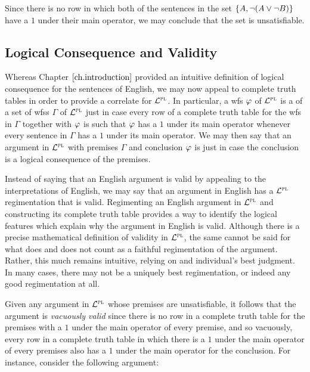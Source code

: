 Since there is no row in which both of the sentences in the set $\lbrace A, \neg (A \vee \neg B)\rbrace$ have a $1$ under their main operator, we may conclude that the set is unsatisfiable.




\subsection{Logical Consequence and Validity}
\label{sub:Consequence}



Whereas Chapter $\ref{ch.introduction}$ provided an intuitive definition of logical consequence for the sentences of English, we may now appeal to complete truth tables in order to provide a correlate for $\mathcal{L}^{\textsc{pl}}$.
In particular, a wfs $\varphi$ of $\mathcal{L}^{\textsc{pl}}$ is a  of a set of wfss $\Gamma$ of $\mathcal{L}^{\textsc{pl}}$ just in case every row of a complete truth table for the wfs in $\Gamma$ together with $\varphi$ is such that $\varphi$ has a $1$ under its main operator whenever every sentence in $\Gamma$ has a $1$ under its main operator. 
We may then say that an argument in $\mathcal{L}^{\textsc{pl}}$ with premises $\Gamma$ and conclusion $\varphi$ is  just in case the conclusion is a logical consequence of the premises. 

Instead of saying that an English argument is valid by appealing to the interpretations of English, we may say that an argument in English has a $\mathcal{L}^{\textsc{pl}}$ regimentation that is valid. 
Regimenting an English argument in $\mathcal{L}^{\textsc{pl}}$ and constructing its complete truth table provides a way to identify the logical features which explain why the argument in English is valid.
Although there is a precise mathematical definition of validity in $\mathcal{L}^{\textsc{pl}}$, the same cannot be said for what does and does not count as a faithful regimentation of the argument.
Rather, this much remains intuitive, relying on and individual's best judgment.
In many cases, there may not be a uniquely best regimentation, or indeed any good regimentation at all.

Given any argument in $\mathcal{L}^{\textsc{pl}}$ whose premises are unsatisfiable, it follows that the argument is \textit{vacuously valid} since there is no row in a complete truth table for the premises with a $1$ under the main operator of every premise, and so vacuously, every row in a complete truth table in which there is a $1$ under the main operator of every premises also has a $1$ under the main operator for the conclusion.
For instance, consider the following argument:
    
